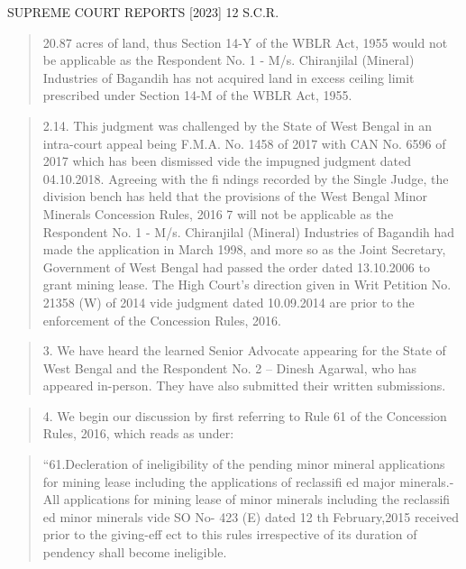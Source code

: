 \documentclass[12pt,a4paper]{article}
\newenvironment{judgequote}
  {\begin{quote}\small}
  {\end{quote}}
\begin{document}

 SUPREME COURT REPORTS [2023] 12 S.C.R.


\begin{judgequote}
20.87 acres of land, thus Section 14-Y of the WBLR Act, 1955 would not be
applicable as the Respondent No. 1 - M/s. Chiranjilal (Mineral) Industries
of Bagandih has not acquired land in excess ceiling limit prescribed under
Section 14-M of the WBLR Act, 1955.
\end{judgequote}

\begin{judgequote}
2.14. This judgment was challenged by the State of West Bengal in
an intra-court appeal being F.M.A. No. 1458 of 2017 with CAN No. 6596
of 2017 which has been dismissed vide the impugned judgment dated
04.10.2018. Agreeing with the fi ndings recorded by the Single Judge,
the division bench has held that the provisions of the West Bengal Minor
Minerals Concession Rules, 2016 7 will not be applicable as the Respondent
No. 1 - M/s. Chiranjilal (Mineral) Industries of Bagandih had made the
application in March 1998, and more so as the Joint Secretary, Government
of West Bengal had passed the order dated 13.10.2006 to grant mining
lease. The High Court's direction given in Writ Petition No. 21358 (W) of
2014 vide judgment dated 10.09.2014 are prior to the enforcement of the
Concession Rules, 2016.
\end{judgequote}

\begin{judgequote}
3. We have heard the learned Senior Advocate appearing for the State
of West Bengal and the Respondent No. 2 -- Dinesh Agarwal, who has
appeared in-person. They have also submitted their written submissions.
\end{judgequote}

\begin{judgequote}
4. We begin our discussion by first referring to Rule 61 of the
Concession Rules, 2016, which reads as under:
\end{judgequote}

\begin{judgequote}
``61.Decleration of ineligibility of the pending minor mineral
applications for mining lease including the applications of
reclassifi ed major minerals.- All applications for mining lease of
minor minerals including the reclassifi ed minor minerals vide SO No-
423 (E) dated 12 th February,2015 received prior to the giving-eff ect
to this rules irrespective of its duration of pendency shall become
ineligible.
\end{judgequote}
\end{document}
